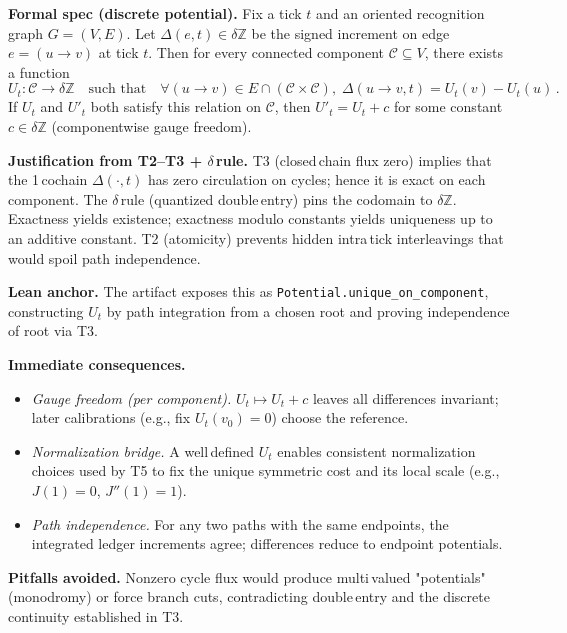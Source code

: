\documentclass[11pt]{article}
\begin{document}
\medskip
\textbf{Formal spec (discrete potential).} Fix a tick $t$ and an oriented recognition graph $G=(V,E)$. Let $\Delta(e,t)\in \delta\mathbb Z$ be the signed increment on edge $e=(u\to v)$ at tick $t$. Then for every connected component $\mathcal C\subseteq V$, there exists a function
\begin{equation*}
  U_t : \mathcal C \to \delta\mathbb Z\quad \text{such that}\quad \forall (u\to v)\in E\cap (\mathcal C\times \mathcal C),\; \Delta(u\to v,t) = U_t(v) - U_t(u)\,.
\end{equation*}
If $U_t$ and $U'_t$ both satisfy this relation on $\mathcal C$, then $U'_t = U_t + c$ for some constant $c\in \delta\mathbb Z$ (componentwise gauge freedom).

\textbf{Justification from T2–T3 + $\delta$\,rule.} T3 (closed\,chain flux zero) implies that the 1\,cochain $\Delta(\cdot,t)$ has zero circulation on cycles; hence it is exact on each component. The $\delta$\,rule (quantized double\,entry) pins the codomain to $\delta\mathbb Z$. Exactness yields existence; exactness modulo constants yields uniqueness up to an additive constant. T2 (atomicity) prevents hidden intra\,tick interleavings that would spoil path independence.

\textbf{Lean anchor.} The artifact exposes this as \texttt{Potential.unique\_on\_component}, constructing $U_t$ by path integration from a chosen root and proving independence of root via T3.

\textbf{Immediate consequences.}
\begin{itemize}[leftmargin=*]
  \item \emph{Gauge freedom (per component).} $U_t \mapsto U_t + c$ leaves all differences invariant; later calibrations (e.g., fix $U_t(v_0)=0$) choose the reference.
  \item \emph{Normalization bridge.} A well\,defined $U_t$ enables consistent normalization choices used by T5 to fix the unique symmetric cost and its local scale (e.g., $J(1)=0$, $J''(1)=1$).
  \item \emph{Path independence.} For any two paths with the same endpoints, the integrated ledger increments agree; differences reduce to endpoint potentials.
\end{itemize}

\textbf{Pitfalls avoided.} Nonzero cycle flux would produce multi\,valued "potentials" (monodromy) or force branch cuts, contradicting double\,entry and the discrete continuity established in T3.
\end{document}
